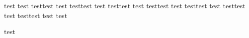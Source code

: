\documentclass{article}
\begin{document}
\lipsum[1-5]
test test testtest test testtest test testtest test testtest test testtest test testtest test testtest test test

test
\end{document}
